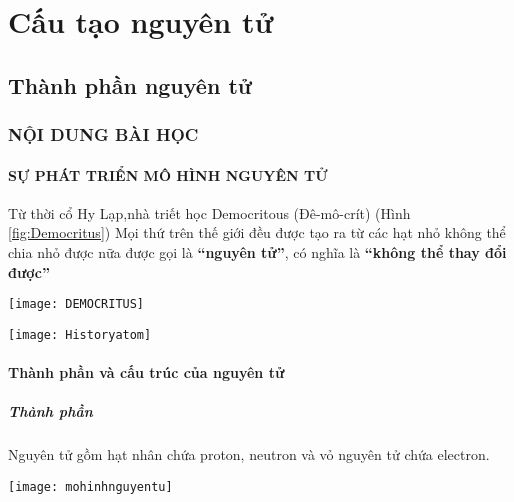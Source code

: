 \chapter{Cấu tạo nguyên tử}
\section{Thành phần nguyên tử}
\subsection{NỘI DUNG BÀI HỌC}
\subsubsection{SỰ PHÁT TRIỂN MÔ HÌNH NGUYÊN TỬ}
\begin{hoplythuyet}
\begin{minipage}[htp!]{0.5\textwidth}
Từ thời cổ Hy Lạp,nhà triết học Democritous (Đê-mô-crít) (Hình \ref{fig:Democritus})
Mọi thứ trên thế giới đều được tạo ra từ các hạt nhỏ không thể chia nhỏ được nữa được gọi là \textbf{“nguyên tử”}, có nghĩa là \textbf{“không thể thay đổi được”}
\end{minipage}
\begin{minipage}[htp!]{0.5\textwidth}
\begin{center}
		\texttt{[image: DEMOCRITUS]}
\end{center}
\end{minipage}

\begin{center}
	\texttt{[image: Historyatom]}
\end{center}
\end{hoplythuyet}
\subsubsection{Thành phần và cấu trúc của nguyên tử}
\paragraph{Thành phần}
\begin{hoplythuyet}
	Nguyên tử gồm hạt nhân chứa proton, neutron và vỏ nguyên tử chứa electron.
	\begin{center}
		\texttt{[image: mohinhnguyentu]}
	\end{center}
\end{hoplythuyet}
